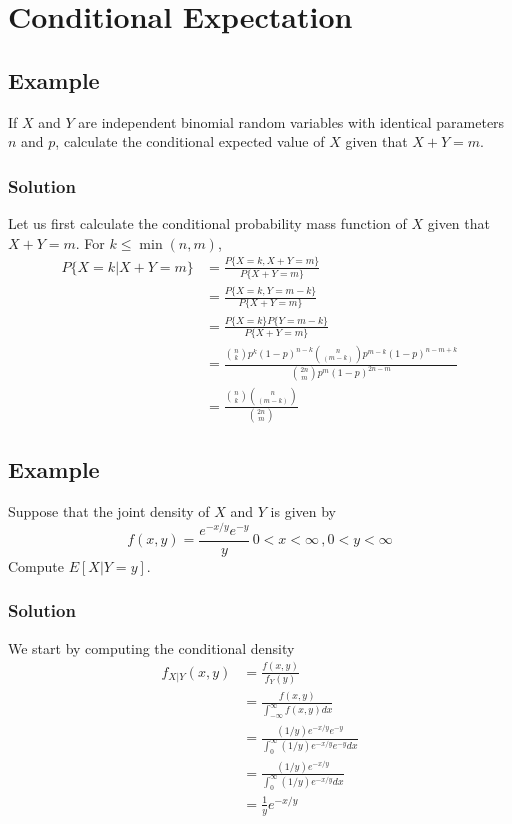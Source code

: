 \section{Conditional Expectation}
\subsection*{Example}
If $X$ and $Y$ are independent binomial random variables with identical parameters $n$ and $p$, calculate the conditional expected value of $X$ given that $X + Y = m$.
\subsubsection*{Solution}
Let us first calculate the conditional probability mass function of $X$ given that $X + Y = m$. For $k\leq \min(n,m)$, \begin{equation*}
    \begin{split}
        P\{X = k | X + Y = m\} &= \frac{P\{X = k, X + Y = m\}}{P\{X + Y = m\}}\\
        &= \frac{P\{X = k, Y = m - k\}}{P\{X + Y = m\}}\\
        &= \frac{P\{X = k\}P\{Y = m - k\}}{P\{X + Y = m\}}\\
        &= \frac{{n\choose k}p^k(1-p)^{n-k}{n\choose(m-k)}p^{m - k}(1 - p)^{n-m+k}}{{2n\choose m}p^m(1-p)^{2n-m}}\\
        &= \frac{{n\choose k}{n\choose(m-k)}}{{2n\choose m}}
    \end{split}
\end{equation*}
\subsection*{Example}
Suppose that the joint density of $X$ and $Y$ is given by \[f(x,y) = \frac{e^{-x/y}e^{-y}}{y}\, 0 < x < \infty\, , 0 < y < \infty\] Compute $E[X|Y = y]$. 
\subsubsection*{Solution}
We start by computing the conditional density \begin{equation*}
    \begin{split}
        f_{X|Y}(x,y) &= \frac{f(x,y)}{f_Y(y)}\\
        &= \frac{f(x,y)}{\int^\infty_{-\infty} f(x,y) dx}\\
        &= \frac{(1/y)e^{-x/y}e^{-y}}{\int^\infty_0 (1/y)e^{-x/y}e^{-y} dx}\\
        &= \frac{(1/y)e^{-x/y}}{\int^\infty_0 (1/y) e^{-x/y} dx}\\
        &= \frac{1}{y}e^{-x/y}\\
    \end{split}
\end{equation*}
